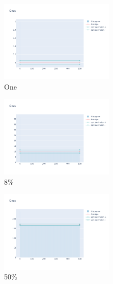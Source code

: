 \documentclass[12pt, fleqn]{report}                             %
\theoremstyle{break}                                            %
\begin{document}
      \begin{figure}[ht!]
        \centering
        \begin{subfigure}[b]{0.4\linewidth}
          \includegraphics[width=0.6\textwidth]{Images/200/dia-a.png}
          \caption{One}
        \end{subfigure}
        \begin{subfigure}[b]{0.4\linewidth}
          \includegraphics[width=0.6\textwidth]{Images/200/dia-b.png}
          \caption{8\%}
        \end{subfigure}
        \begin{subfigure}[b]{0.4\linewidth}
          \includegraphics[width=0.6\textwidth]{Images/200/dia-c.png}
          \caption{50\%}
        \end{subfigure}
        \begin{subfigure}[b]{0.4\linewidth}

\end{subfigure}
\end{figure}
\end{document}
